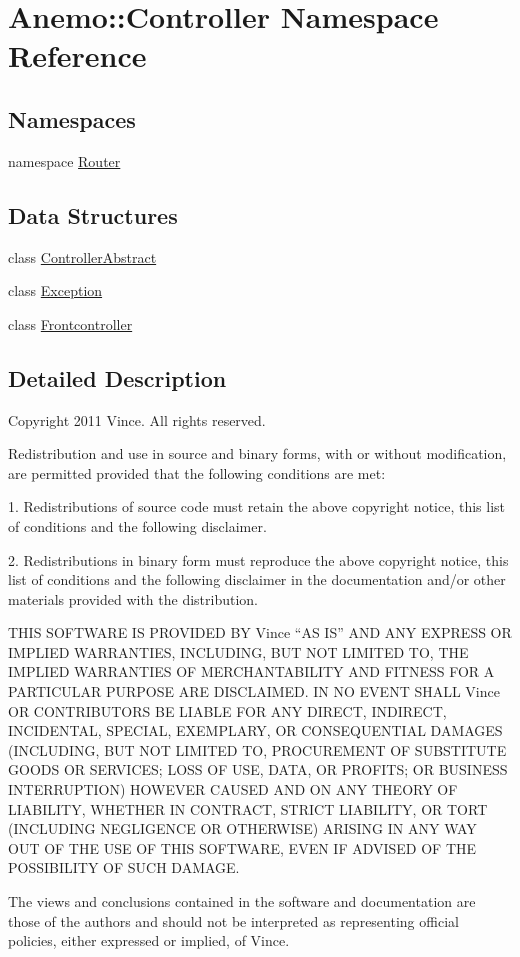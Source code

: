 \hypertarget{namespace_anemo_1_1_controller}{
\section{Anemo::Controller Namespace Reference}
\label{namespace_anemo_1_1_controller}
}
\subsection*{Namespaces}
\begin{DoxyCompactItemize}
\item 
namespace \hyperlink{namespace_anemo_1_1_controller_1_1_router}{Router}
\end{DoxyCompactItemize}
\subsection*{Data Structures}
\begin{DoxyCompactItemize}
\item 
class \hyperlink{class_anemo_1_1_controller_1_1_controller_abstract}{ControllerAbstract}
\item 
class \hyperlink{class_anemo_1_1_controller_1_1_exception}{Exception}
\item 
class \hyperlink{class_anemo_1_1_controller_1_1_frontcontroller}{Frontcontroller}
\end{DoxyCompactItemize}


\subsection{Detailed Description}
Copyright 2011 Vince. All rights reserved.

Redistribution and use in source and binary forms, with or without modification, are permitted provided that the following conditions are met:

1. Redistributions of source code must retain the above copyright notice, this list of conditions and the following disclaimer.

2. Redistributions in binary form must reproduce the above copyright notice, this list of conditions and the following disclaimer in the documentation and/or other materials provided with the distribution.

THIS SOFTWARE IS PROVIDED BY Vince ``AS IS'' AND ANY EXPRESS OR IMPLIED WARRANTIES, INCLUDING, BUT NOT LIMITED TO, THE IMPLIED WARRANTIES OF MERCHANTABILITY AND FITNESS FOR A PARTICULAR PURPOSE ARE DISCLAIMED. IN NO EVENT SHALL Vince OR CONTRIBUTORS BE LIABLE FOR ANY DIRECT, INDIRECT, INCIDENTAL, SPECIAL, EXEMPLARY, OR CONSEQUENTIAL DAMAGES (INCLUDING, BUT NOT LIMITED TO, PROCUREMENT OF SUBSTITUTE GOODS OR SERVICES; LOSS OF USE, DATA, OR PROFITS; OR BUSINESS INTERRUPTION) HOWEVER CAUSED AND ON ANY THEORY OF LIABILITY, WHETHER IN CONTRACT, STRICT LIABILITY, OR TORT (INCLUDING NEGLIGENCE OR OTHERWISE) ARISING IN ANY WAY OUT OF THE USE OF THIS SOFTWARE, EVEN IF ADVISED OF THE POSSIBILITY OF SUCH DAMAGE.

The views and conclusions contained in the software and documentation are those of the authors and should not be interpreted as representing official policies, either expressed or implied, of Vince. 